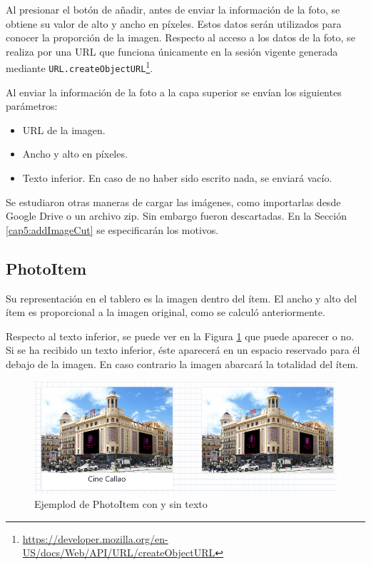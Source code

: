 Al presionar el botón de añadir, antes de enviar la información de la foto, se obtiene su valor de alto y ancho en píxeles. Estos datos serán utilizados para conocer la proporción de la imagen. Respecto al acceso a los datos de la foto, se realiza por una URL que funciona únicamente en la sesión vigente generada mediante \texttt{URL.createObjectURL}\footnote{\url{https://developer.mozilla.org/en-US/docs/Web/API/URL/createObjectURL}}.

Al enviar la información de la foto a la capa superior se envían los siguientes parámetros: 

\begin{itemize}
	\item URL de la imagen.
	\item Ancho y alto en píxeles.
	\item Texto inferior. En caso de no haber sido escrito nada, se enviará vacío.
\end{itemize}

Se estudiaron otras maneras de cargar las imágenes, como importarlas desde Google Drive o un archivo zip. Sin embargo fueron descartadas. En la Sección \ref{cap5:addImageCut} se especificarán los motivos. 

\subsection{PhotoItem}

Su representación en el tablero es la imagen dentro del ítem. El ancho y alto del ítem es proporcional a la imagen original, como se calculó anteriormente. 

Respecto al texto inferior, se puede ver en la Figura \ref{fig:photoitemtexto} que puede aparecer o no. Si se ha recibido un texto inferior, éste aparecerá en un espacio reservado para él debajo de la imagen. En caso contrario la imagen abarcará la totalidad del ítem.

\begin{figure}[h!]
	\centering
	\includegraphics[width=0.7\linewidth]{Imagenes/Bitmap/photoItemTexto}
	\caption{Ejemplod de PhotoItem con y sin texto}
	\label{fig:photoitemtexto}
\end{figure}



